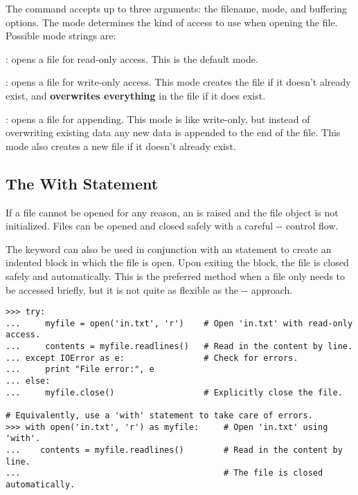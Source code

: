 The  command accepts up to three arguments: the filename, mode, and buffering options.
The mode determines the kind of access to use when opening the file.
Possible mode strings are:
\begin{description}
\item {}: opens a file for read-only access.
This is the default mode.
\item {}: opens a file for write-only access.
This mode creates the file if it doesn't already exist, and \textbf{overwrites everything} in the file if it does exist.
\item {}: opens a file for appending.
This mode is like write-only, but instead of overwriting existing data any new data is appended to the end of the file.
This mode also creates a new file if it doesn't already exist.
\end{description}

\subsection*{The With Statement}

If a file cannot be opened for any reason, an  is raised and the file object is not initialized.
Files can be opened and closed safely with a careful -- control flow.

The keyword  can also be used in conjunction with an  statement to create an indented block in which the file is open.
Upon exiting the block, the file is closed safely and automatically.
This is the preferred method when a file only needs to be accessed briefly, but it is not quite as flexible as the -- approach.

\begin{lstlisting}
>>> try:
...     myfile = open('in.txt', 'r')    # Open 'in.txt' with read-only access.
...     contents = myfile.readlines()   # Read in the content by line.
... except IOError as e:                # Check for errors.
...     print "File error:", e
... else:
...     myfile.close()                  # Explicitly close the file.

# Equivalently, use a 'with' statement to take care of errors.
>>> with open('in.txt', 'r') as myfile:     # Open 'in.txt' using 'with'.
...    contents = myfile.readlines()        # Read in the content by line.
...                                         # The file is closed automatically.
\end{lstlisting}


